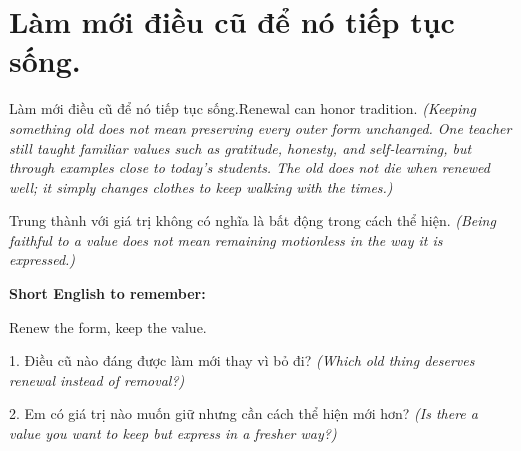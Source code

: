 \section{Làm mới điều cũ để nó tiếp tục sống.}
\begin{truyen}{Làm mới điều cũ để nó tiếp tục sống.}{Renewal can honor tradition.}
\textit{(Keeping something old does not mean preserving every outer form unchanged. One teacher still taught familiar values such as gratitude, honesty, and self-learning, but through examples close to today's students. The old does not die when renewed well; it simply changes clothes to keep walking with the times.)}
\end{truyen}
\begin{baihoc}
Trung thành với giá trị không có nghĩa là bất động trong cách thể hiện.
\textit{(Being faithful to a value does not mean remaining motionless in the way it is expressed.)}
\end{baihoc}
\begin{ghinhoanh}
\textbf{Short English to remember:}

Renew the form, keep the value.
\end{ghinhoanh}
\begin{tuhocnhanh}
1. Điều cũ nào đáng được làm mới thay vì bỏ đi? \textit{(Which old thing deserves renewal instead of removal?)}

2. Em có giá trị nào muốn giữ nhưng cần cách thể hiện mới hơn? \textit{(Is there a value you want to keep but express in a fresher way?)}
\end{tuhocnhanh}
\ngancach
